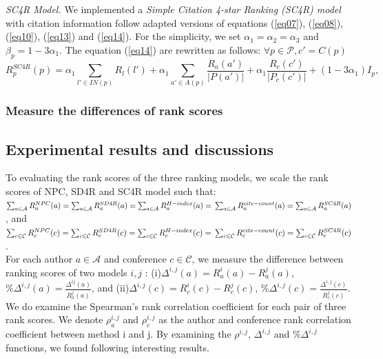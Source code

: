 \documentclass[10pt,leqno,twoside]{article}
\begin{document}
\textit{SC4R Model.} We implemented a \textit{Simple Citation 4-star Ranking (SC4R) model} with citation information follow adapted versions of equations (\ref{eq07}), (\ref{eq08}), (\ref{eq10}), (\ref{eq13}) and (\ref{eq14}).
For the simplicity, we set $\alpha_1=\alpha_2=\alpha_3$ and $\beta_p = 1-3\alpha_1 $.  The equation (\ref{eq14}) are rewritten as follows: $\forall p\in\mathcal{P}, c' = C(p)$\
\begin{equation}\label{eq16}
R^{SC4R}_p(p) = \alpha_1\sum_{l'\in IN(p)}R_l(l') + \alpha_1\sum_{a'\in A(p)}\frac{R_a(a')}{|P(a')|} + \alpha_1\frac{R_c(c')}{|P_c(c')|} + (1-3\alpha_1)I_p,
\end{equation}
\subsubsection{Measure the differences of rank scores}

\subsection{Experimental results and discussions}\label{Sect:Result}

To evaluating the rank scores of the three ranking models, we scale the rank scores of NPC, SD4R and SC4R model such that:
\\
$\sum_{a \in \mathcal{A}} R^{NPC}_a(a) =
\sum_{a \in \mathcal{A}} R^{SD4R}_a(a) =
\sum_{a \in \mathcal{A}} R^{H-index}_a(a) =
\\
\sum_{a \in \mathcal{A}} R^{cite-count}_a(a) =
\sum_{a \in \mathcal{A}} R^{SC4R}_a(a)$,
and
\\
$\sum_{c \in \mathcal{C}} R^{NPC}_c(c) =
\sum_{c \in \mathcal{C}} R^{SD4R}_c(c) =
\sum_{c \in \mathcal{C}} R^{H-index}_c(c) =
\\
\sum_{c \in \mathcal{C}} R^{cite-count}_c(c) =
\sum_{c \in \mathcal{C}} R^{SC4R}_c(c) $.
\\
For each author $a \in \mathcal{A}$ and conference $c\in \mathcal{C}$, we measure the difference between ranking scores of two models $i,j$ : (i)$\Delta^{i,j}(a)= R^i_a(a) - R^j_a(a)$, $\%\Delta^{i,j} (a)= \frac{\Delta^{ij}(a)}{R^j_a(a)}$, and (ii)$\Delta^{i,j} (c)= R^i_c(c) - R^j_c(c)$, $\%\Delta ^{i,j}(c)= \frac{\Delta^{i,j}(c)}{R^j_c(c)}$.
\\
We do examine the Spearman's rank correlation coefficient for each pair of three rank scores. We denote $\rho^{i,j}_a$ and $\rho^{i,j}_c$ as the author and conference rank correlation coefficient between method i and j.
By examining the $\rho^{i,j}$, $\Delta^{i,j}$ and  $\%\Delta^{i,j}$ functions, we found following interesting results.
\end{document}
